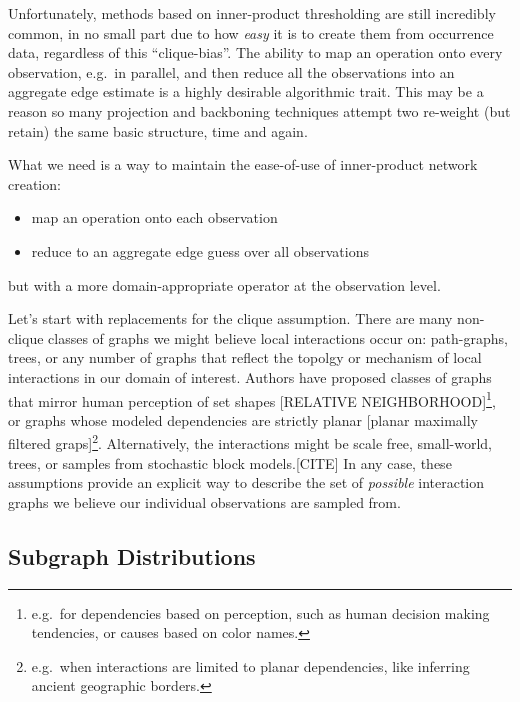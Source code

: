 \documentclass[%
	12pt,
		oneside,
		letterpaper
]{book}
\providecommand{\tightlist}{%
  \setlength{\itemsep}{0pt}\setlength{\parskip}{0pt}}\usepackage{longtable,booktabs,array}
\begin{document}
Unfortunately, methods based on inner-product thresholding are still
incredibly common, in no small part due to how \emph{easy} it is to
create them from occurrence data, regardless of this ``clique-bias''.
The ability to map an operation onto every observation, e.g.~in
parallel, and then reduce all the observations into an aggregate edge
estimate is a highly desirable algorithmic trait. This may be a reason
so many projection and backboning techniques attempt two re-weight (but
retain) the same basic structure, time and again.

What we need is a way to maintain the ease-of-use of inner-product
network creation:

\begin{itemize}
\tightlist
\item
  map an operation onto each observation
\item
  reduce to an aggregate edge guess over all observations
\end{itemize}

but with a more domain-appropriate operator at the observation level.

Let's start with replacements for the clique assumption. There are many
non-clique classes of graphs we might believe local interactions occur
on: path-graphs, trees, or any number of graphs that reflect the topolgy
or mechanism of local interactions in our domain of interest. Authors
have proposed classes of graphs that mirror human perception of set
shapes {[}RELATIVE NEIGHBORHOOD{]}\footnote{ e.g.~for dependencies based
  on perception, such as human decision making tendencies, or causes
  based on color names.}, or graphs whose modeled dependencies are
strictly planar {[}planar maximally filtered graps{]}\footnote{
  e.g.~when interactions are limited to planar dependencies, like
  inferring ancient geographic borders.}. Alternatively, the
interactions might be scale free, small-world, trees, or samples from
stochastic block models.{[}CITE{]} In any case, these assumptions
provide an explicit way to describe the set of \emph{possible}
interaction graphs we believe our individual observations are sampled
from.

\subsection{Subgraph Distributions}\label{subgraph-distributions}
\end{document}
